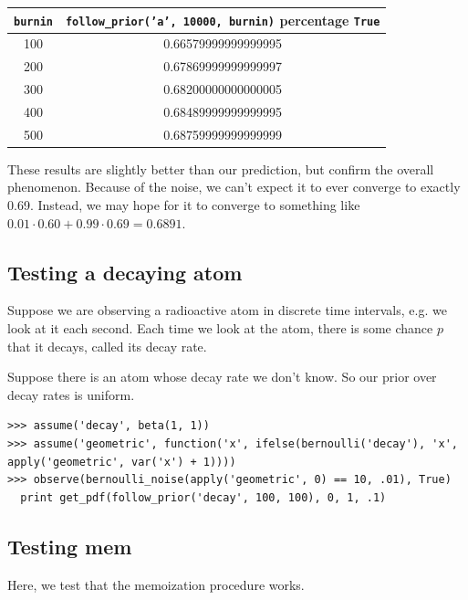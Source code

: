 \documentclass[11pt]{article}
\begin{document}
\begin{center}
\begin{tabular}{|c | c|} \hline
{\tt burnin} & {\tt follow\_prior('a', 10000, burnin)} percentage {\tt True}  \\ \hline
100 &  0.66579999999999995 \\ \hline
200 &  0.67869999999999997 \\ \hline
300 &  0.68200000000000005 \\ \hline
400 &  0.68489999999999995 \\ \hline
500 &  0.68759999999999999 \\ \hline
\end{tabular}
\end{center}

These results are slightly better than our prediction, but confirm the overall phenomenon.  Because of the noise, we can't expect it to ever converge to exactly 0.69.  Instead, we may hope for it to converge to something like $0.01 \cdot 0.60 + 0.99 \cdot 0.69 = 0.6891$.  


\subsection{Testing a decaying atom}

Suppose we are observing a radioactive atom in discrete time intervals, e.g. we look at it each second.  Each time we look at the atom, there is some chance $p$ that it decays, called its decay rate.  

Suppose there is an atom whose decay rate we don't know.  So our prior over decay rates is uniform.  

\begin{small}
\begin{verbatim}
>>> assume('decay', beta(1, 1)) 
>>> assume('geometric', function('x', ifelse(bernoulli('decay'), 'x', apply('geometric', var('x') + 1))))
>>> observe(bernoulli_noise(apply('geometric', 0) == 10, .01), True)
  print get_pdf(follow_prior('decay', 100, 100), 0, 1, .1) 

\end{verbatim}
\end{small}

\subsection{Testing mem}

Here, we test that the memoization procedure works.  
\end{document}
